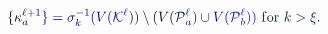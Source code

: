 \documentclass[12pt]{article}
\begin{document}
\makeatletter
\renewcommand*{\@textcolor}[3]{%
  \protect\leavevmode
  \begingroup
    \color#1{#2}#3%
  \endgroup
}
\makeatother
\begin{displaymath}
\mathcolor[RGB]{0,0,15}{\{} \mathcolor[RGB]{0,0,30}{\kappa} _ { \mathcolor[RGB]{0,0,45}{a} } ^ { \mathcolor[RGB]{0,0,60}{\ell} \mathcolor[RGB]{0,0,75}{+} \mathcolor[RGB]{0,0,90}{1} } \mathcolor[RGB]{0,0,105}{\}} \mathcolor[RGB]{0,0,120}{=} \mathcolor[RGB]{0,0,135}{\sigma} _ { \mathcolor[RGB]{0,0,150}{k} } ^ { \mathcolor[RGB]{0,0,165}{-} \mathcolor[RGB]{0,0,180}{1} } \mathcolor[RGB]{0,0,195}{(} \mathcolor[RGB]{0,0,210}{V} \mathcolor[RGB]{0,0,225}{(} \mathcal { \mathcolor[RGB]{0,0,240}{K} } ^ { \mathcolor[RGB]{0,0,255}{\ell} } \mathcolor[RGB]{0,15,0}{)} \mathcolor[RGB]{0,15,15}{)} \mathcolor[RGB]{0,15,30}{\setminus} \mathcolor[RGB]{0,15,45}{(} \mathcolor[RGB]{0,15,60}{V} \mathcolor[RGB]{0,15,75}{(} \mathcal { \mathcolor[RGB]{0,15,90}{P} } _ { \mathcolor[RGB]{0,15,105}{a} } ^ { \mathcolor[RGB]{0,15,120}{\ell} } \mathcolor[RGB]{0,15,135}{)} \mathcolor[RGB]{0,15,150}{\cup} \mathcolor[RGB]{0,15,165}{V} \mathcolor[RGB]{0,15,180}{(} \mathcal { \mathcolor[RGB]{0,15,195}{P} } _ { \mathcolor[RGB]{0,15,210}{b} } ^ { \mathcolor[RGB]{0,15,225}{\ell} } \mathcolor[RGB]{0,15,240}{)} \mathcolor[RGB]{0,15,255}{)} \mathrm { ~ \mathcolor[RGB]{0,30,0}{f} \mathcolor[RGB]{0,30,15}{o} \mathcolor[RGB]{0,30,30}{r} ~ } \mathcolor[RGB]{0,30,45}{k} \mathcolor[RGB]{0,30,60}{>} \mathcolor[RGB]{0,30,75}{\xi} \mathcolor[RGB]{0,30,90}{.}
\end{displaymath}
\end{document}
